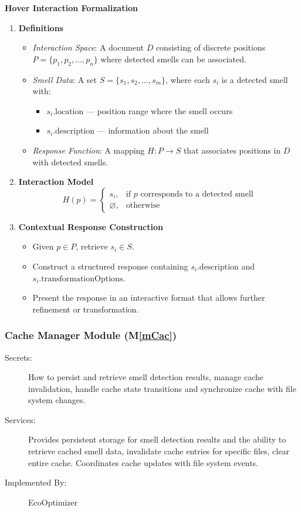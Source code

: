 \documentclass[12pt, titlepage]{article}
\newcommand{\mref}[1]{M\ref{#1}}
\begin{document}
\textbf{Hover Interaction Formalization}
\begin{enumerate}
  \item \textbf{Definitions}
  \begin{itemize}
      \item \textit{Interaction Space}: A document \( D \) consisting of discrete positions \( P = \{ p_1, p_2, \dots, p_n \} \) where detected smells can be associated.
      \item \textit{Smell Data}: A set \( S = \{ s_1, s_2, \dots, s_m \} \), where each \( s_i \) is a detected smell with:
        \begin{itemize}
            \item \( s_i.\text{location} \) — position range where the smell occurs
            \item \( s_i.\text{description} \) — information about the smell
        \end{itemize}
      \item \textit{Response Function}: A mapping \( H: P \to S \) that associates positions in \( D \) with detected smells.
  \end{itemize}

  \item \textbf{Interaction Model}
  \[
  H(p) =
  \begin{cases} 
      s_i, & \text{if } p \text{ corresponds to a detected smell} \\
      \varnothing, & \text{otherwise}
  \end{cases}
  \]

  \item \textbf{Contextual Response Construction}
  \begin{itemize}
      \item Given \( p \in P \), retrieve \( s_i \in S \).
      \item Construct a structured response containing \( s_i.\text{description} \) and \( s_i.\text{transformationOptions} \).
      \item Present the response in an interactive format that allows further refinement or transformation.
  \end{itemize}
\end{enumerate}

\subsubsection{Cache Manager Module (\mref{mCac})}

\begin{description}
    \item[Secrets:] How to persist and retrieve smell detection results, manage cache invalidation, handle cache state transitions and synchronize cache with file system changes. 
    \item[Services:] Provides persistent storage for smell detection results and the ability to retrieve cached smell data, invalidate cache entries for specific files, clear entire cache.  Coordinates cache updates with file system events. 
    \item[Implemented By:] EcoOptimizer
\end{description}
\end{document}
